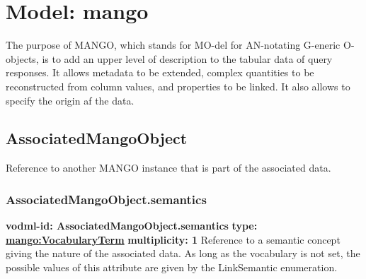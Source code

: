 
%



    
    
    
    
    
    
      

\pagebreak
\section{Model: mango }
  

  The purpose of MANGO, which stands for MO-del for AN-notating G-eneric O-objects, is to add an upper level of description to the tabular data of query responses. It allows metadata to be extended, complex quantities to be reconstructed from column values, and properties to be linked. It also allows to specify the origin af the data.

  \subsection{AssociatedMangoObject}
  \label{sect:AssociatedMangoObject}
    Reference to another MANGO instance that is part of the associated data.

    \subsubsection{AssociatedMangoObject.semantics}
      \textbf{vodml-id: AssociatedMangoObject.semantics} \newline
      \textbf{type: \hyperref[sect:VocabularyTerm]{mango:VocabularyTerm}} \newline
      \textbf{multiplicity: 1} \newline
      Reference to a semantic concept giving the nature of the associated data. As long as the vocabulary is not set, the possible values of this attribute are given by the LinkSemantic enumeration.

